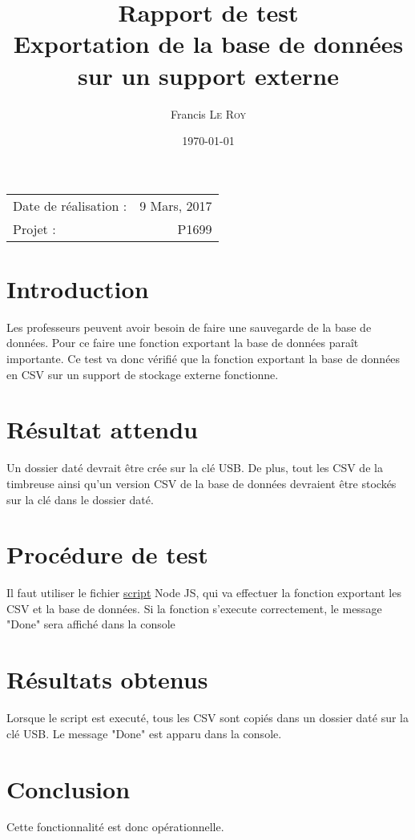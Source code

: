\documentclass[10pt,a4paper,onecolumn]{article}
\title{Rapport de test \\ Exportation de la base de données \\ sur un support externe}
\author{Francis \textsc{Le Roy}}
\date{\today}
\begin{document}
\maketitle
\thispagestyle{fancy}

\begin{center}
\begin{tabular}{l r}
Date de réalisation : & 9 Mars, 2017 \\
Projet : & P1699 \\
\end{tabular}
\end{center}

\section{Introduction}
Les professeurs peuvent avoir besoin de faire une sauvegarde de la base de données. Pour ce faire une fonction exportant la base de données paraît importante. Ce test va donc vérifié que la fonction exportant la base de données en CSV sur un support de stockage externe fonctionne.
\section{Résultat attendu}
Un dossier daté devrait être crée sur la clé USB. De plus, tout les CSV de la timbreuse ainsi qu'un version CSV de la base de données devraient être stockés sur la clé dans le dossier daté.
\section{Procédure de test}
Il faut utiliser le fichier \href{run:../../../test/export_db.js}{script} Node JS, qui va effectuer la fonction exportant les CSV et la base de données. Si la fonction s'execute correctement, le message "Done" sera affiché dans la console
\section{Résultats obtenus}
Lorsque le script est executé, tous les CSV sont copiés dans un dossier daté sur la clé USB. Le message "Done" est apparu dans la console.
\section{Conclusion}
Cette fonctionnalité est donc opérationnelle.
\end{document}
